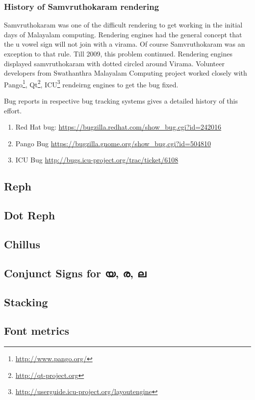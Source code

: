\subsubsection{History of Samvruthokaram rendering}

Samvruthokaram was one of the difficult rendering to get working in the initial 
days of Malayalam computing.
Rendering engines had the general concept that the u vowel sign will not join 
with a virama. Of course Samvruthokaram was an exception to that rule.
Till 2009, this problem continued. Rendering engines displayed samvruthokaram 
with dotted circled around Virama. 
Volunteer developers from Swathanthra Malayalam Computing project worked 
closely with Pango\footnote{\url{http://www.pango.org/}}, 
Qt\footnote{\url{http://qt-project.org}}, 
ICU\footnote{\url{http://userguide.icu-project.org/layoutengine}} rendeirng 
engines to get the bug fixed.

Bug reports in respective bug tracking systems gives a detailed history of this 
effort.

\begin{enumerate}
  \item Red Hat bug: \url{https://bugzilla.redhat.com/show_bug.cgi?id=242016}
  \item Pango Bug \url{https://bugzilla.gnome.org/show_bug.cgi?id=504810}
  \item ICU Bug \url{http://bugs.icu-project.org/trac/ticket/6108}
\end{enumerate}

\subsection {Reph}
\subsection {Dot Reph}
\subsection {Chillus}
\subsection {Conjunct Signs for യ, ര, ല}
\subsection {Stacking}
\subsection {Font metrics} 
